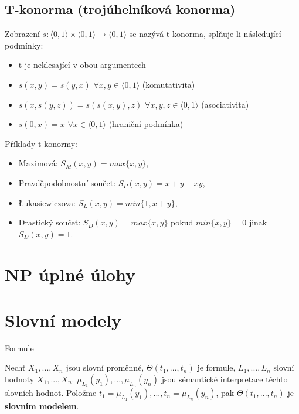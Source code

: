 \subsection{T-konorma (trojúhelníková konorma)}

\begin{definition}
Zobrazení $s:\langle 0,1\rangle \times \langle 0,1\rangle \rightarrow \langle 0,1\rangle$ se nazývá t-konorma, splňuje-li následující podmínky:
\begin{itemize}
\item  t je neklesající v obou argumentech
\item  $s(x,y)=s(y,x)$  $\forall x,y\in \langle 0,1 \rangle$ (komutativita)
\item  $s(x,s(y,z))=s(s(x,y),z) $  $\forall x,y,z\in \langle 0,1 \rangle$ (asociativita)
\item $s(0,x)=x$  $\forall x\in \langle 0,1 \rangle$ (hraniční podmínka)
\end{itemize}
\end{definition}

Příklady t-konormy:
\begin{itemize}
\item Maximová: $S_M (x,y)=max\{x,y\}$, 
\item Pravděpodobnostní součet: $S_P(x,y)=x+y-xy$, 
\item Łukasiewiczova: $S_L (x,y)=min\{1,x+y\}$,
\item Drastický součet: $S_D(x,y)=max\{x,y\}$ pokud $min\{x,y\}=0$ jinak $S_D(x,y)=1$.
\end{itemize}







\section{NP úplné úlohy}

\section{Slovní modely}

\begin{definition}
Formule
\end{definition}

\begin{definition}
Nechť $X_1,...,X_n$ jsou slovní proměnné, $\Theta(t_1,...,t_n)$ je formule, $L_1,...,L_n$ slovní hodnoty $X_1,...,X_n$. $\mu_{L_1}(y_1),...,\mu_{L_n}(y_n)$ jsou sémantické interpretace těchto slovních hodnot. Položme $t_1=\mu_{L_1}(y_1),...,t_n=\mu_{L_n}(y_n)$, pak $\Theta(t_1,...,t_n)$ je \textbf{slovním modelem}. 
\end{definition}

